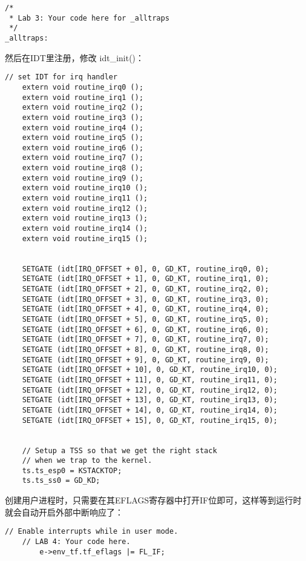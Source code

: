 \documentclass{article}
\newcommand{\funcname}[1]{{\ttfamily \small #1}}
\begin{document}
\begin{CJK*}{UTF8}{gkai}
\begin{lstlisting}[style=acode, title={\scriptsize \ttfamily \bfseries kern/trapentry.S}]
/*
 * Lab 3: Your code here for _alltraps
 */
_alltraps:

\end{lstlisting}

然后在IDT里注册，修改 \funcname{idt\_init()}：

\begin{lstlisting}[style=ccode, title={\scriptsize \ttfamily \bfseries kern/trap.c: idt\_init()}]
    // set IDT for irq handler
    extern void routine_irq0 ();
    extern void routine_irq1 ();
    extern void routine_irq2 ();
    extern void routine_irq3 ();
    extern void routine_irq4 ();
    extern void routine_irq5 ();
    extern void routine_irq6 ();
    extern void routine_irq7 ();
    extern void routine_irq8 ();
    extern void routine_irq9 ();
    extern void routine_irq10 ();
    extern void routine_irq11 ();
    extern void routine_irq12 ();
    extern void routine_irq13 ();
    extern void routine_irq14 ();
    extern void routine_irq15 ();


    SETGATE (idt[IRQ_OFFSET + 0], 0, GD_KT, routine_irq0, 0);
    SETGATE (idt[IRQ_OFFSET + 1], 0, GD_KT, routine_irq1, 0);
    SETGATE (idt[IRQ_OFFSET + 2], 0, GD_KT, routine_irq2, 0);
    SETGATE (idt[IRQ_OFFSET + 3], 0, GD_KT, routine_irq3, 0);
    SETGATE (idt[IRQ_OFFSET + 4], 0, GD_KT, routine_irq4, 0);
    SETGATE (idt[IRQ_OFFSET + 5], 0, GD_KT, routine_irq5, 0);
    SETGATE (idt[IRQ_OFFSET + 6], 0, GD_KT, routine_irq6, 0);
    SETGATE (idt[IRQ_OFFSET + 7], 0, GD_KT, routine_irq7, 0);
    SETGATE (idt[IRQ_OFFSET + 8], 0, GD_KT, routine_irq8, 0);
    SETGATE (idt[IRQ_OFFSET + 9], 0, GD_KT, routine_irq9, 0);
    SETGATE (idt[IRQ_OFFSET + 10], 0, GD_KT, routine_irq10, 0);
    SETGATE (idt[IRQ_OFFSET + 11], 0, GD_KT, routine_irq11, 0);
    SETGATE (idt[IRQ_OFFSET + 12], 0, GD_KT, routine_irq12, 0);
    SETGATE (idt[IRQ_OFFSET + 13], 0, GD_KT, routine_irq13, 0);
    SETGATE (idt[IRQ_OFFSET + 14], 0, GD_KT, routine_irq14, 0);
    SETGATE (idt[IRQ_OFFSET + 15], 0, GD_KT, routine_irq15, 0);
    

    // Setup a TSS so that we get the right stack
    // when we trap to the kernel.
    ts.ts_esp0 = KSTACKTOP;
    ts.ts_ss0 = GD_KD;
\end{lstlisting}

创建用户进程时，只需要在其EFLAGS寄存器中打开IF位即可，这样等到运行时就会自动开启外部中断响应了：

\begin{lstlisting}[style=ccode, title={\scriptsize \ttfamily \bfseries kern/env.c: env\_alloc()}]
	// Enable interrupts while in user mode.
	// LAB 4: Your code here.
        e->env_tf.tf_eflags |= FL_IF;
\end{lstlisting}


\end{CJK*}
\end{document}
